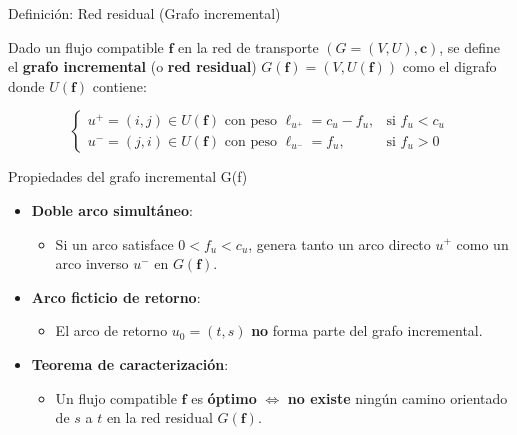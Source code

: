 \documentclass[
  ignorenonframetext,
]{beamer}
\providecommand{\tightlist}{%
  \setlength{\itemsep}{0pt}\setlength{\parskip}{0pt}}
\begin{document}
\begin{frame}{Definición: Red residual (Grafo incremental)}
\label{definiciuxf3n-red-residual-grafo-incremental}
\begin{tcolorbox}[enhanced jigsaw, opacityback=0, breakable, title=\textcolor{quarto-callout-note-color}{\faInfo}\hspace{0.5em}{Red residual G(f)}, colback=white, colbacktitle=quarto-callout-note-color!10!white, bottomrule=.15mm, opacitybacktitle=0.6, coltitle=black, bottomtitle=1mm, leftrule=.75mm, colframe=quarto-callout-note-color-frame, toptitle=1mm, titlerule=0mm, rightrule=.15mm, left=2mm, arc=.35mm, toprule=.15mm]

Dado un flujo compatible \(\mathbf{f}\) en la red de transporte
\((G = (V, U), \mathbf{c})\), se define el \textbf{grafo incremental} (o
\textbf{red residual}) \(G(\mathbf{f}) = (V, U(\mathbf{f}))\) como el
digrafo donde \(U(\mathbf{f})\) contiene:

\[
\begin{cases}
u^+ = (i, j) \in U(\mathbf{f}) \text{ con peso } \ell_{u^+} = c_u - f_u, & \text{si } f_u < c_u \\
u^- = (j, i) \in U(\mathbf{f}) \text{ con peso } \ell_{u^-} = f_u, & \text{si } f_u > 0
\end{cases}
\]

\end{tcolorbox}
\end{frame}

\begin{frame}{Propiedades del grafo incremental G(f)}
\label{propiedades-del-grafo-incremental-gf}
\begin{itemize}
\tightlist
\item
  \textbf{Doble arco simultáneo}:

  \begin{itemize}
  \tightlist
  \item
    Si un arco satisface \(0 < f_u < c_u\), genera tanto un arco directo
    \(u^+\) como un arco inverso \(u^-\) en \(G(\mathbf{f})\).
  \end{itemize}
\item
  \textbf{Arco ficticio de retorno}:

  \begin{itemize}
  \tightlist
  \item
    El arco de retorno \(u_0 = (t, s)\) \textbf{no} forma parte del
    grafo incremental.
  \end{itemize}
\item
  \textbf{Teorema de caracterización}:

  \begin{itemize}
  \tightlist
  \item
    Un flujo compatible \(\mathbf{f}\) es \textbf{óptimo} \(\iff\)
    \textbf{no existe} ningún camino orientado de \(s\) a \(t\) en la
    red residual \(G(\mathbf{f})\).
  \end{itemize}
\end{itemize}
\end{frame}
\end{document}
